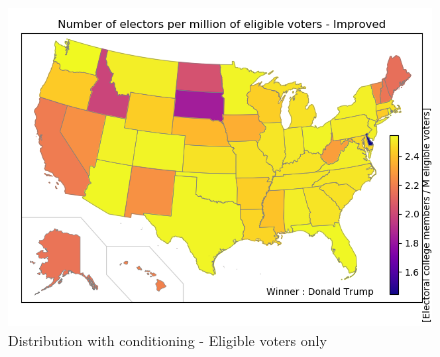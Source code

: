 \documentclass[a4paper,9pt,calibri,oneside,openany, twocolumn]{report}
\theoremstyle{break}
\begin{document}
\begin{figure}[H]
	\centering
	\includegraphics[width=\linewidth]{mapEligibleImproved}
	\caption{Distribution with conditioning - Eligible voters only}
\end{figure}
\end{document}
